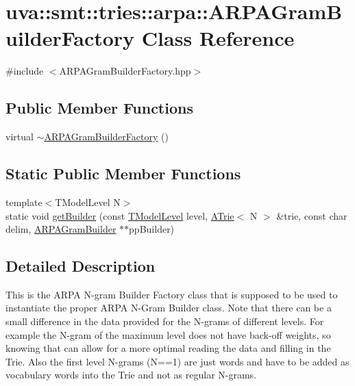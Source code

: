\hypertarget{classuva_1_1smt_1_1tries_1_1arpa_1_1_a_r_p_a_gram_builder_factory}{}\section{uva\+:\+:smt\+:\+:tries\+:\+:arpa\+:\+:A\+R\+P\+A\+Gram\+Builder\+Factory Class Reference}
\label{classuva_1_1smt_1_1tries_1_1arpa_1_1_a_r_p_a_gram_builder_factory}


{\ttfamily \#include $<$A\+R\+P\+A\+Gram\+Builder\+Factory.\+hpp$>$}

\subsection*{Public Member Functions}
\begin{DoxyCompactItemize}
\item 
virtual \hyperlink{classuva_1_1smt_1_1tries_1_1arpa_1_1_a_r_p_a_gram_builder_factory_a66e551c1d15723bad56b8aa5b91ee87f}{$\sim$\+A\+R\+P\+A\+Gram\+Builder\+Factory} ()
\end{DoxyCompactItemize}
\subsection*{Static Public Member Functions}
\begin{DoxyCompactItemize}
\item 
{\footnotesize template$<$T\+Model\+Level N$>$ }\\static void \hyperlink{classuva_1_1smt_1_1tries_1_1arpa_1_1_a_r_p_a_gram_builder_factory_ae1660962aa1469cfaff841df0b404d13}{get\+Builder} (const \hyperlink{namespaceuva_1_1smt_1_1tries_a26064146e98856c7c4185efab0e61a36}{T\+Model\+Level} level, \hyperlink{classuva_1_1smt_1_1tries_1_1_a_trie}{A\+Trie}$<$ N $>$ \&trie, const char delim, \hyperlink{classuva_1_1smt_1_1tries_1_1arpa_1_1_a_r_p_a_gram_builder}{A\+R\+P\+A\+Gram\+Builder} $\ast$$\ast$pp\+Builder)
\end{DoxyCompactItemize}


\subsection{Detailed Description}
This is the A\+R\+P\+A N-\/gram Builder Factory class that is supposed to be used to instantiate the proper A\+R\+P\+A N-\/\+Gram Builder class. Note that there can be a small difference in the data provided for the N-\/grams of different levels. For example the N-\/gram of the maximum level does not have back-\/off weights, so knowing that can allow for a more optimal reading the data and filling in the Trie. Also the first level N-\/grams (N==1) are just words and have to be added as vocabulary words into the Trie and not as regular N-\/grams. 

